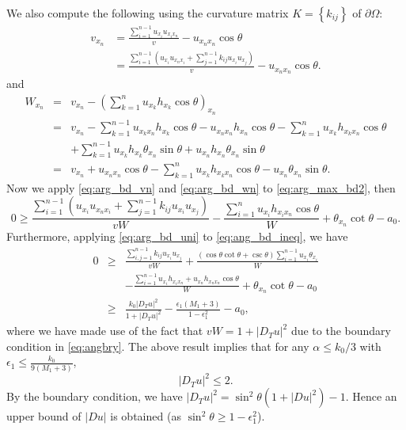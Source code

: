 \documentclass[12pt]{article}
\numberwithin{equation}{section}
\theoremstyle{plain}
\theoremstyle{definition}
\theoremstyle{remark}
\begin{document}
We also compute the following using the curvature matrix $K=\left\{k_{ij}\right\}$ of $\partial\Omega$:
\begin{equation} \label{eq:arg_bd_vn}
\begin{split}
    v_{x_n} & = \frac{\sum_{i=1}^{n-1} u_{x_i} u_{x_i x_n} }{v} - u_{x_n x_n} \cos{\theta} \\
    & = \frac{\sum_{i=1}^{n-1} \left( u_{x_i} u_{x_n x_i} + \sum_{j=1}^{n-1} k_{ij} u_{x_i} u_{x_j} \right) }{v} - u_{x_n x_n} \cos{\theta}.
\end{split}
\end{equation}
and
\begin{eqnarray} 
    W_{x_n} & = &v_{x_n} - \left( \sum_{k=1}^n u_{x_k} h_{x_k} \cos \theta \right)_{x_n} \nonumber\\
    & = &v_{x_n} - \sum_{k=1}^{n-1} u_{x_k x_n} h_{x_k} \cos \theta - u_{x_n x_n} h_{x_n} \cos \theta - \sum_{k=1}^n u_{x_k} h_{x_k x_n} \cos \theta
    \nonumber\\
    && + \sum_{k=1}^{n-1} u_{x_k} h_{x_k} \theta_{x_n} \sin{\theta} + u_{x_n} h_{x_n} \theta_{x_n} \sin{\theta}\nonumber \\
    & = &v_{x_n} +  u_{x_n x_n} \cos \theta - \sum_{k=1}^n u_{x_k} h_{x_k x_n} \cos \theta - u_{x_n} \theta_{x_n} \sin{\theta}.\label{eq:arg_bd_wn}
\end{eqnarray}
Now we apply \eqref{eq:arg_bd_vn} and \eqref{eq:arg_bd_wn} to \eqref{eq:arg_max_bd2}, then
\begin{equation} \label{eq:ang_bd_ineq}
    0 \geq \frac{\sum_{i=1}^{n-1} \left( u_{x_i} u_{x_n x_i} + \sum_{j=1}^{n-1} k_{ij} u_{x_i} u_{x_j} \right) }{vW} -  \frac{ \sum_{i=1}^n u_{x_i} h_{x_i x_n} \cos \theta  }{W} + \theta_{x_n} \cot{\theta} - a_0.
\end{equation}
Furthermore, applying \eqref{eq:arg_bd_uni} to \eqref{eq:ang_bd_ineq}, we have
\begin{eqnarray*}
    0 &\geq &  \frac{ \sum_{i,j=1}^{n-1} k_{ij} u_{x_i} u_{x_j} }{vW} + \frac{ (\cos{\theta} \cot{\theta} + \csc{\theta}) \sum_{i=1}^{n-1} u_{x_i} \theta_{x_i}  }{W} \\
    &&-  \frac{ \sum_{i=1}^{n-1} u_{x_i} h_{x_i x_n} + u_{x_n} h_{x_n x_n} \cos \theta  }{W} + \theta_{x_n} \cot{\theta} - a_0 \\
    &\geq & \frac{k_0 |D_Tu|^2}{1+ |D_Tu|^2 } - \frac{\epsilon_1 (M_1+3)}{1- \epsilon_1^2} - a_0,
\end{eqnarray*}
where we have made use of the fact that $vW = 1+|D_Tu|^2$ due to the boundary condition in \eqref{eq:angbry}. The above result implies that for any $\alpha \leq k_0/3$ with $\epsilon_1 \leq \frac{k_0}{9(M_1+3)}$,
\begin{equation*}
    |D_Tu|^2\leq 2.
\end{equation*}
By the boundary condition, we have 
$\displaystyle
|D_Tu|^2 = \sin^2\theta(1+|Du|^2)-1.
$
Hence an upper bound of $|Du|$ is obtained (as $\sin^2\theta \geq 1-\epsilon^2_1$). \\ \\
\end{document}
